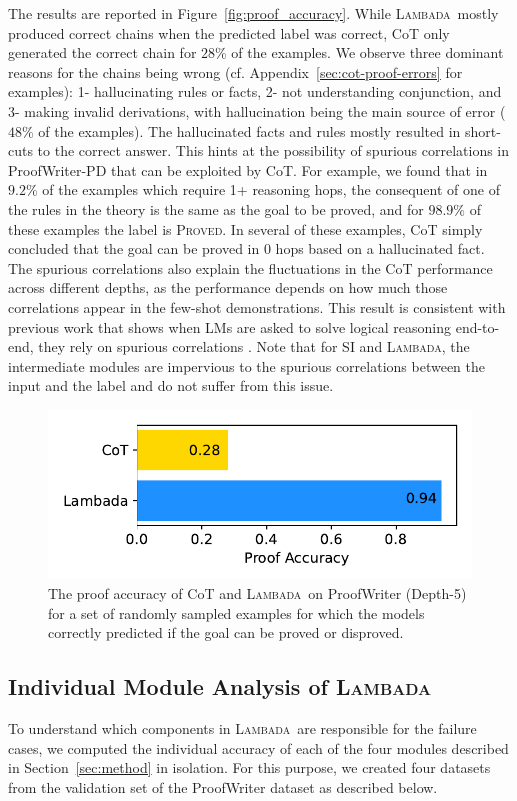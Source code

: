 \documentclass[11pt]{article}
\newcommand{\algo}{\textsc{Lambada}}
\newcommand{\proved}{\textsc{Proved}}
\begin{document}
The results are reported in Figure~\ref{fig:proof_accuracy}. While \algo\ mostly produced correct chains when the predicted label was correct, CoT only generated the correct chain for $28\%$ of the examples. We observe three dominant reasons for the chains being wrong (cf. Appendix~\ref{sec:cot-proof-errors} for examples): 1- hallucinating rules or facts, 2- not understanding conjunction, and 3- making invalid derivations, with hallucination being the main source of error ($48\%$ of the examples). The hallucinated facts and rules mostly resulted in short-cuts to the correct answer. This hints at the possibility of spurious correlations in ProofWriter-PD that can be exploited by CoT. For example, we found that in $9.2\%$ of the examples which require 1+ reasoning hops, the consequent of one of the rules in the theory is the same as the goal to be proved, and for $98.9\%$ of these examples the label is \proved. In several of these examples, CoT simply concluded that the goal can be proved in $0$ hops based on a hallucinated fact. The spurious correlations also explain the fluctuations in the CoT performance across different depths, as the performance depends on how much those correlations appear in the few-shot demonstrations. This result is consistent with previous work that shows when LMs are asked to solve logical reasoning end-to-end, they rely on spurious correlations \cite{zhang2022paradox}. Note that for SI and \algo, the intermediate modules are impervious to the spurious correlations between the input and the label and do not suffer from this issue.

\begin{figure}[t]
  \centering
  \includegraphics[width=0.8\columnwidth]{proof_accuracy.pdf}
  \caption{%
  \label{fig:proof_accuracy} %
    The proof accuracy of CoT and \algo\ on ProofWriter (Depth-5) for a set of randomly sampled examples for which the models correctly predicted if the goal can be proved or disproved.
  }
  \label{fig:pud}
\end{figure}

\subsection{Individual Module Analysis of \algo} \label{sec:failure-modes}
To understand which components in \algo\ are responsible for the failure cases, we computed the individual accuracy of each of the four modules described in Section~\ref{sec:method} in isolation. For this purpose, we created four datasets from the validation set of the ProofWriter dataset as described below. 
\end{document}
